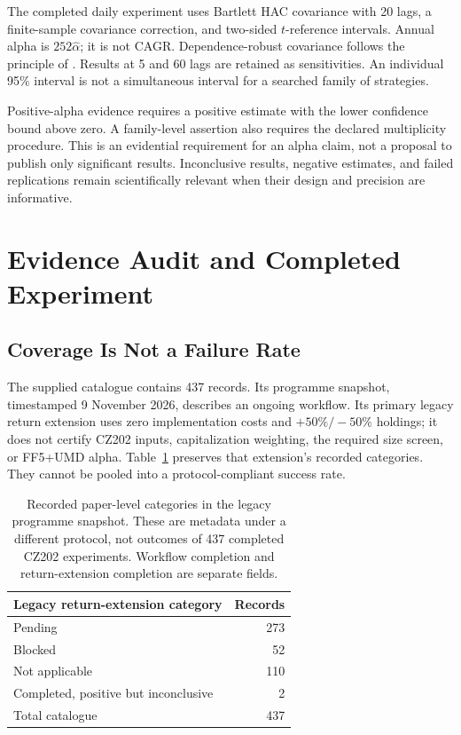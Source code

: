 \documentclass{article}
\begin{document}
The completed daily experiment uses Bartlett HAC covariance with 20 lags, a finite-sample covariance correction, and two-sided $t$-reference intervals. Annual alpha is $252\widehat\alpha$; it is not CAGR. Dependence-robust covariance follows the principle of \cite{newey1987}. Results at 5 and 60 lags are retained as sensitivities. An individual 95\% interval is not a simultaneous interval for a searched family of strategies.

Positive-alpha evidence requires a positive estimate with the lower confidence bound above zero. A family-level assertion also requires the declared multiplicity procedure. This is an evidential requirement for an alpha claim, not a proposal to publish only significant results. Inconclusive results, negative estimates, and failed replications remain scientifically relevant when their design and precision are informative.

\section{Evidence Audit and Completed Experiment}
\subsection{Coverage Is Not a Failure Rate}
The supplied catalogue contains 437 records. Its programme snapshot, timestamped 9 November 2026, describes an ongoing workflow. Its primary legacy return extension uses zero implementation costs and $+50\%/-50\%$ holdings; it does not certify CZ202 inputs, capitalization weighting, the required size screen, or FF5+UMD alpha. Table~\ref{tab:coverage} preserves that extension's recorded categories. They cannot be pooled into a protocol-compliant success rate.

\begin{table}[t]
\centering
\begin{tabular}{lr}
\toprule
Legacy return-extension category & Records\\
\midrule
Pending & 273\\
Blocked & 52\\
Not applicable & 110\\
Completed, positive but inconclusive & 2\\
\midrule
Total catalogue & 437\\
\bottomrule
\end{tabular}
\caption{Recorded paper-level categories in the legacy programme snapshot. These are metadata under a different protocol, not outcomes of 437 completed CZ202 experiments. Workflow completion and return-extension completion are separate fields.}
\label{tab:coverage}
\end{table}
\end{document}
